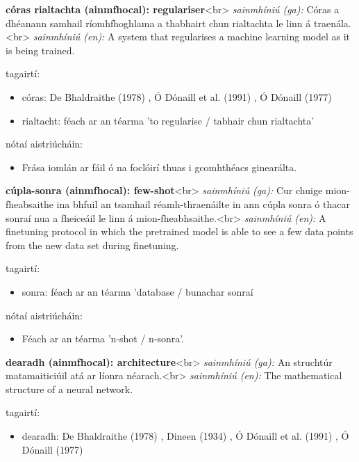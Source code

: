 \documentclass{article}
\begin{document}
\textbf{córas rialtachta (ainmfhocal): regulariser}<br>
\textit{sainmhíniú (ga):} Córas a dhéanann samhail ríomhfhoghlama a thabhairt chun rialtachta le linn á traenála.<br>
\textit{sainmhíniú (en):} A system that regularises a machine learning model as it is being trained.

tagairtí:
\begin{itemize}
	\item córas: De Bhaldraithe (1978) \cite{de-bhaldraithe}, Ó Dónaill et al. (1991) \cite{focloir-beag}, Ó Dónaill (1977) \cite{odonaill}
	\item rialtacht: féach ar an téarma 'to regularise / tabhair chun rialtachta'
\end{itemize}

nótaí aistriúcháin:
\begin{itemize}
	\item Frása iomlán ar fáil ó na foclóirí thuas i gcomhthéacs ginearálta.
\end{itemize}


\textbf{cúpla-sonra (ainmfhocal): few-shot}<br>
\textit{sainmhíniú (ga):} Cur chuige mion-fheabsaithe ina bhfuil an tsamhail réamh-thraenáilte in ann cúpla sonra ó thacar sonraí nua a fheiceáil le linn á mion-fheabhsaithe.<br>
\textit{sainmhíniú (en):} A finetuning protocol in which the pretrained model is able to see a few data points from the new data set during finetuning.

tagairtí:
\begin{itemize}
	\item sonra: féach ar an téarma 'database / bunachar sonraí
\end{itemize}

nótaí aistriúcháin:
\begin{itemize}
	\item Féach ar an téarma 'n-shot / n-sonra'.
\end{itemize}


\textbf{dearadh (ainmfhocal): architecture}<br>
\textit{sainmhíniú (ga):} An struchtúr matamaiticiúil atá ar líonra néarach.<br>
\textit{sainmhíniú (en):} The mathematical structure of a neural network.

tagairtí:
\begin{itemize}
	\item dearadh: De Bhaldraithe (1978) \cite{de-bhaldraithe}, Dineen (1934) \cite{dineen}, Ó Dónaill et al. (1991) \cite{focloir-beag}, Ó Dónaill (1977) \cite{odonaill}
\end{itemize}
\end{document}
